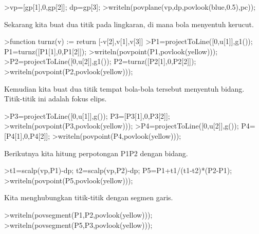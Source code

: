\documentclass[a4paper,10pt]{article}
\begin{document}
\begin{eulernotebook}
\begin{eulercomment}
\begin{eulercomment}
\begin{eulercomment}
\begin{eulercomment}
\begin{eulercomment}
\begin{eulercomment}
\begin{eulercomment}
\begin{eulercomment}
\begin{eulercomment}
\begin{eulercomment}
\begin{eulercomment}
\begin{eulercomment}
\begin{eulercomment}
\begin{eulercomment}
\begin{eulercomment}
\begin{eulercomment}
\begin{eulercomment}
\begin{eulercomment}
\begin{eulercomment}
\begin{eulercomment}
\begin{eulercomment}
\begin{eulercomment}
\begin{eulercomment}
\begin{eulercomment}
\begin{eulercomment}
\begin{eulercomment}
\begin{eulercomment}
\begin{eulercomment}
\begin{eulercomment}
\begin{eulercomment}
\begin{eulercomment}
\begin{eulercomment}
\begin{eulercomment}
\begin{eulercomment}
\begin{eulerprompt}
>vp=[gp[1],0,gp[2]]; dp=gp[3];
>writeln(povplane(vp,dp,povlook(blue,0.5),pc));
\end{eulerprompt}
\begin{eulercomment}
Sekarang kita buat dua titik pada lingkaran, di mana bola menyentuh
kerucut.
\end{eulercomment}
\begin{eulerprompt}
>function turnz(v) := return [-v[2],v[1],v[3]]
>P1=projectToLine([0,u[1]],g1()); P1=turnz([P1[1],0,P1[2]]);
>writeln(povpoint(P1,povlook(yellow)));
>P2=projectToLine([0,u[2]],g1()); P2=turnz([P2[1],0,P2[2]]);
>writeln(povpoint(P2,povlook(yellow)));
\end{eulerprompt}
\begin{eulercomment}
Kemudian kita buat dua titik tempat bola-bola tersebut menyentuh
bidang. Titik-titik ini adalah fokus elips.
\end{eulercomment}
\begin{eulerprompt}
>P3=projectToLine([0,u[1]],g()); P3=[P3[1],0,P3[2]];
>writeln(povpoint(P3,povlook(yellow)));
>P4=projectToLine([0,u[2]],g()); P4=[P4[1],0,P4[2]];
>writeln(povpoint(P4,povlook(yellow)));
\end{eulerprompt}
\begin{eulercomment}
Berikutnya kita hitung perpotongan P1P2 dengan bidang.
\end{eulercomment}
\begin{eulerprompt}
>t1=scalp(vp,P1)-dp; t2=scalp(vp,P2)-dp; P5=P1+t1/(t1-t2)*(P2-P1);
>writeln(povpoint(P5,povlook(yellow)));
\end{eulerprompt}
\begin{eulercomment}
Kita menghubungkan titik-titik dengan segmen garis.
\end{eulercomment}
\begin{eulerprompt}
>writeln(povsegment(P1,P2,povlook(yellow)));
>writeln(povsegment(P5,P3,povlook(yellow)));

\end{eulerprompt}
\end{eulercomment}
\end{eulercomment}
\end{eulercomment}
\end{eulercomment}
\end{eulercomment}
\end{eulercomment}
\end{eulercomment}
\end{eulercomment}
\end{eulercomment}
\end{eulercomment}
\end{eulercomment}
\end{eulercomment}
\end{eulercomment}
\end{eulercomment}
\end{eulercomment}
\end{eulercomment}
\end{eulercomment}
\end{eulercomment}
\end{eulercomment}
\end{eulercomment}
\end{eulercomment}
\end{eulercomment}
\end{eulercomment}
\end{eulercomment}
\end{eulercomment}
\end{eulercomment}
\end{eulercomment}
\end{eulercomment}
\end{eulercomment}
\end{eulercomment}
\end{eulercomment}
\end{eulercomment}
\end{eulercomment}
\end{eulercomment}
\end{eulernotebook}
\end{document}
